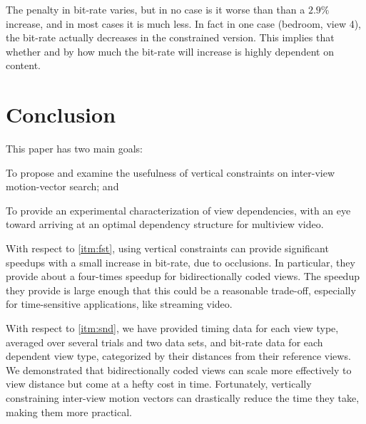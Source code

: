 \documentclass{sig-alternate-05-2015}
\begin{document}
The penalty in bit-rate varies, but in no case is it worse than than a
$2.9\%$ increase, and in most cases it is much less. In fact in one case
(bedroom, view 4), the bit-rate actually decreases in the constrained version.
This implies that whether and by how much the bit-rate will increase is highly
dependent on content.

\section{Conclusion} %
\label{sec:conclusion} %
This paper has two main goals: \begin{compactenum}
\item \label{itm:fst} To propose and examine the usefulness of vertical
constraints on inter-view motion-vector search; and
\item \label{itm:snd} To provide an experimental characterization of view
dependencies, with an eye toward arriving at an optimal dependency structure for
multiview video. \end{compactenum}

With respect to \ref{itm:fst}, using vertical constraints can provide
significant speedups with a small increase in bit-rate, due to occlusions. 
In particular, they provide about a four-times speedup for bidirectionally
coded views. The speedup they provide is large enough that this could be a
reasonable trade-off, especially for time-sensitive applications, like streaming
video.

With respect to \ref{itm:snd}, we have provided timing data for each view type,
averaged over several trials and two data sets, and bit-rate data for each
dependent view type, categorized by their distances from their reference views.
We demonstrated that bidirectionally coded views can scale more effectively to
view distance but come at a hefty cost in time. Fortunately, vertically
constraining inter-view motion vectors can drastically reduce the time they
take, making them more practical.

\balance


\end{document}
